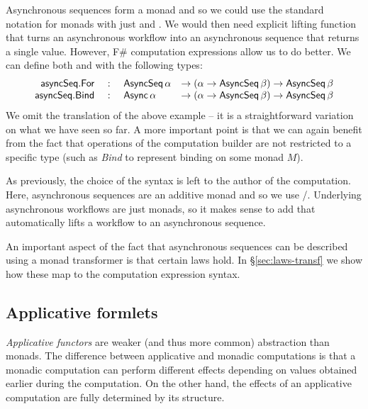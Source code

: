 \documentclass[runningheads,a4paper]{llncs}
\begin{document}
Asynchronous sequences form a monad and so we could use the standard notation for monads with
just  and . We would then need explicit lifting function that turns
an asynchronous workflow into an asynchronous sequence that returns a single value. However,
F\# computation expressions allow us to do better. We can define both  and 
 with the following types:
%
\begin{equation*}
\begin{array}{rcll}
\textnormal{\sffamily asyncSeq}.\textnormal{\sffamily For} &~:~& \textnormal{\sffamily AsyncSeq}\,\alpha &
   \rightarrow (\alpha \rightarrow \textnormal{\sffamily AsyncSeq}\,\beta) \rightarrow \textnormal{\sffamily AsyncSeq}\,\beta\\
\textnormal{\sffamily asyncSeq}.\textnormal{\sffamily Bind} &~:~& \textnormal{\sffamily Async}\,\alpha   &
   \rightarrow (\alpha \rightarrow \textnormal{\sffamily AsyncSeq}\,\beta) \rightarrow \textnormal{\sffamily AsyncSeq}\,\beta\\
\end{array}
\end{equation*}
%
We omit the translation of the above example -- it is a straightforward variation on what we have 
seen so far. A more important point is that we can again benefit from the fact that operations
of the computation builder are not restricted to a specific type (such as \emph{Bind} to represent
binding on some monad $M$).

As previously, the choice of the syntax is left to the author of the computation. Here, asynchronous
sequences are an additive monad and so we use /. Underlying
asynchronous workflows are just monads, so it makes sense to add  that automatically
lifts a workflow to an asynchronous sequence.

An important aspect of the fact that asynchronous sequences can be described using a monad
transformer is that certain laws hold. In \S\ref{sec:laws-transf} we show how these map to the 
computation expression syntax.


\subsection{Applicative formlets}
\label{sec:intro-formlets}

\emph{Applicative functors} \cite{applicative,idioms-obliv} are weaker (and thus more common) 
abstraction than monads. The difference between applicative and monadic computations is that 
a monadic computation can perform different effects depending on values obtained earlier during the 
computation. On the other hand, the effects of an applicative computation are fully determined 
by its structure. 
\end{document}
